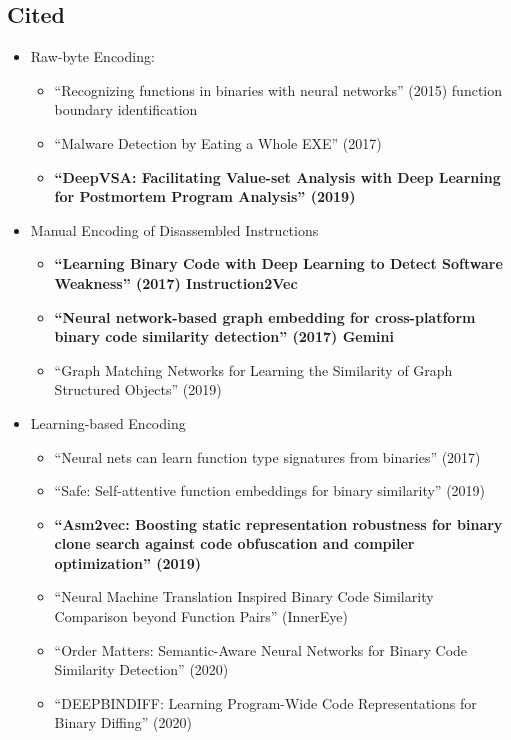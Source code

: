 \documentclass{article}
\begin{document}
\subsection*{Cited}
\begin{itemize}
	\item Raw-byte Encoding:
	\begin{itemize}
		\item ``Recognizing functions in binaries with neural networks'' (2015) function boundary identification
		\item ``Malware Detection by Eating a Whole EXE'' (2017)
		\item \textbf{``{DeepVSA}: Facilitating Value-set Analysis with Deep Learning for Postmortem Program Analysis'' (2019)}
	\end{itemize}
	\item Manual Encoding of Disassembled Instructions
	\begin{itemize}
		\item \textbf{``Learning Binary Code with Deep Learning to Detect Software Weakness'' (2017) Instruction2Vec}
		\item \textbf{``Neural network-based graph embedding for cross-platform binary code similarity detection'' (2017) Gemini}
		\item ``Graph Matching Networks for Learning the Similarity of Graph Structured Objects'' (2019)
	\end{itemize}
	\item Learning-based Encoding
	\begin{itemize}
		\item ``Neural nets can learn function type signatures from binaries'' (2017)
		\item ``Safe: Self-attentive function embeddings for binary similarity'' (2019)
		\item \textbf{``Asm2vec: Boosting static representation robustness for binary clone search against code obfuscation and compiler optimization'' (2019)}
		\item ``Neural Machine Translation Inspired Binary Code Similarity Comparison beyond Function Pairs'' (InnerEye)
		\item ``Order Matters: Semantic-Aware Neural Networks for Binary Code Similarity Detection'' (2020)
		\item ``DEEPBINDIFF: Learning Program-Wide Code Representations for Binary Diffing'' (2020)
	\end{itemize}
\end{itemize}
\end{document}
